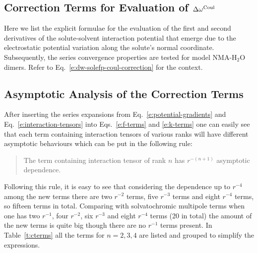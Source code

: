 \documentclass[b5paper,oneside,fleqn,11pt]{book}
\begin{document}
\begin{appendices}
\chapter{Correction Terms for Evaluation of $\Delta \omega^{\rm Coul}$\label{a:fk-terms}}

Here we list the explicit formulae for the evaluation of the first and second derivatives
of the solute\hyp{}solvent interaction potential that emerge due to the electrostatic potential
variation along the solute's normal coordinate. Subsequently, the series 
convergence properties are tested for model NMA-H$_2$O dimers. 
Refer to Eq.~\eqref{e:dw-solefp-coul-correction}
for the context.

\section{Asymptotic Analysis of the Correction Terms}

After inserting the series expansions from Eq.~\eqref{e:potential-gradients} 
and Eq.~\eqref{e:interaction-tensors} into Eqs.~\eqref{e:f-terms} and \eqref{e:k-terms}
one can easily see that each term containing interaction tensors of various ranks
will have different asymptotic behaviours which can be put in 
the following rule:
%
\begin{quote}
The term containing interaction tensor of rank $n$ 
has $r^{-(n+1)}$ asymptotic dependence.
\end{quote}
%
Following this rule,
it is easy to see that considering the dependence up to $r^{-4}$ among the new terms
there are two $r^{-2}$ terms, five $r^{-3}$ terms and eight
$r^{-4}$ terms, so fifteen terms in total. Comparing with 
solvatochromic multipole terms when one has two $r^{-1}$,
four $r^{-2}$, six $r^{-3}$ and eight $r^{-4}$ terms (20 in total)
the amount of the new terms is quite big though there are no $r^{-1}$ 
terms present. In Table~\ref{t:cterms} all the terms for $n=2,3,4$
are listed and grouped to simplify the expressions.


\end{appendices}
\end{document}
